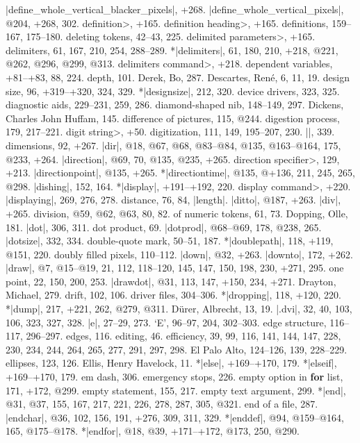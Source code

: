 |define_whole_vertical_blacker_pixels|, +268.
|define_whole_vertical_pixels|, @204, +268, 302.
\<definition>, +165.
\<definition heading>, +165.
definitions, 159--167, 175--180.
deleting tokens, 42--43, 225.
\<delimited parameters>, +165.
delimiters, 61, 167, 210, 254, 288--289.
*|delimiters|, 61, 180, 210, +218, @221, @262, @296, @299, @313.
\<delimiters command>, +218.
dependent variables, +81--+83, 88, 224.
depth, 101.
Derek, Bo, 287.
Descartes, Ren\'e, 6, 11, 19.
design size, 96, +319--+320, 324, 329.
*|designsize|, 212, 320.
device drivers, 323, 325.
diagnostic aids, 229--231, 259, 286.
diamond-shaped nib, 148--149, 297.
Dickens, Charles John Huffam, 145.
difference of pictures, 115, @244.
digestion process, 179, 217--221.
\<digit string>, +50.
digitization, 111, 149, 195--207, 230.
|\digits|, 339.
dimensions, 92, +267.
|dir|, @18, @67, @68, @83--@84, @135, @163--@164, 175, @233, +264.
|direction|, @69, 70, @135, @235, +265.
\<direction specifier>, 129, +213.
|directionpoint|, @135, +265.
*|directiontime|, @135, @+136, 211, 245, 265, @298.
|dishing|, 152, 164.
*|display|, +191--+192, 220.
\<display command>, +220.
|displaying|, 269, 276, 278.
distance, 76, 84, \also |length|.
|ditto|, @187, +263.
|div|, +265.
division, @59, @62, @63, 80, 82.
\sub of numeric tokens, 61, 73.
Dopping, Olle, 181.
|dot|, 306, 311.
dot product, 69.
|dotprod|, @68--@69, 178, @238, 265.
|dotsize|, 332, 334.
double-quote mark, 50--51, 187.
*|doublepath|, 118, +119, @151, 220.
doubly filled pixels, 110--112.
|down|, @32, +263.
|downto|, 172, +262.
|draw|, @7, @15--@19, 21, 112, 118--120, 145, 147, 150, 198, 230, +271, 295.
\sub one point, 22, 150, 200, 253.
|drawdot|, @31, 113, 147, +150, 234, +271.
Drayton, Michael, 279.
drift, 102, 106.
driver files, 304--306.
*|dropping|, 118, +120, 220.
*|dump|, 217, +221, 262, @279, @311.
D\"urer, Albrecht, 13, 19.
|.dvi|, 32, 40, 103, 106, 323, 327, 328.
\newletter
|e|, 27--29, 273.
`E', 96--97, 204, 302--303.
edge structure, 116--117, 296--297.
edges, 116.
editing, 46.
efficiency, 39, 99, 116, 141, 144, 147, 228, 230, 234, 244, 264, 265, 277,
 291, 297, 298.
El Palo Alto, 124--126, 139, 228--229.
ellipses, 123, 126.
Ellis, Henry Havelock, 11.
*|else|, +169--+170, 179.
*|elseif|, +169--+170, 179.
em dash, 306.
emergency stops, 226.
empty option in {\bf for\/} list, 171, +172, @299.
empty statement, 155, 217.
empty text argument, 299.
*|end|, @31, @37, 155, 167, 217, 221, 226, 278, 287, 305, @321.
end of a file, 287.
|endchar|, @36, 102, 156, 191, +276, 309, 311, 329.
*|enddef|, @94, @159--@164, 165, @175--@178.
*|endfor|, @18, @39, +171--+172, @173, 250, @290.
